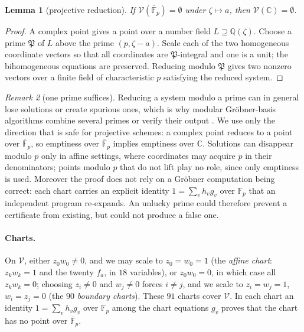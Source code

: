 \documentclass[11pt]{article}
\newtheorem{lemma}{Lemma}
\theoremstyle{definition}
\theoremstyle{remark}
\newtheorem{remark}[lemma]{Remark}
\newcommand{\C}{\mathbb{C}}
\newcommand{\Q}{\mathbb{Q}}
\newcommand{\F}{\mathbb{F}}
\newcommand{\Fp}{\overline{\mathbb{F}}_p}
\begin{document}
\begin{lemma}[projective reduction]\label{lem:A}
If $\mathcal V(\Fp)=\emptyset$ under $\zeta\mapsto a$, then $\mathcal V(\C)=\emptyset$.
\end{lemma}
\begin{proof}
A complex point gives a point over a number field $L\supseteq\Q(\zeta)$. Choose a prime $\mathfrak P$ of $L$ above the
prime $(p,\zeta-a)$. Scale each of the two homogeneous coordinate vectors so that all coordinates are
$\mathfrak P$-integral and one is a unit; the bihomogeneous equations are preserved. Reducing modulo $\mathfrak P$ gives
two nonzero vectors over a finite field of characteristic $p$ satisfying the reduced system.
\end{proof}

\begin{remark}[one prime suffices]
Reducing a system modulo a prime can in general lose solutions or create spurious ones, which is why modular
Gr\"obner-basis algorithms combine several primes or verify their output \cite{Arnold2003,MST2021}. We use only the
direction that is safe for projective schemes: a complex point reduces to a point over $\Fp$, so emptiness over $\Fp$
implies emptiness over $\C$. Solutions can disappear modulo $p$ only in affine settings, where coordinates may acquire
$p$ in their denominators; points modulo $p$ that do not lift play no role, since only emptiness is used. Moreover the
proof does not rely on a Gr\"obner computation being correct: each chart carries an explicit identity
$1=\sum_vh_vg_v$ over $\F_p$ that an independent program re-expands. An unlucky prime could therefore prevent a
certificate from existing, but could not produce a false one.
\end{remark}

\paragraph{Charts.} On $\mathcal V$, either $z_0w_0\ne0$, and we may scale to $z_0=w_0=1$ (the \emph{affine chart}:
$z_kw_k=1$ and the twenty $f_a$, in $18$ variables), or $z_0w_0=0$, in which case all $z_kw_k=0$; choosing
$z_i\neq0$ and $w_j\neq0$ forces $i\neq j$, and we scale to $z_i=w_j=1$, $w_i=z_j=0$ (the $90$ \emph{boundary charts}).
These $91$ charts cover $\mathcal V$. In each chart an identity $1=\sum_vh_vg_v$ over $\F_p$ among the chart
equations $g_v$ proves that the chart has no point over $\Fp$.
\end{document}
